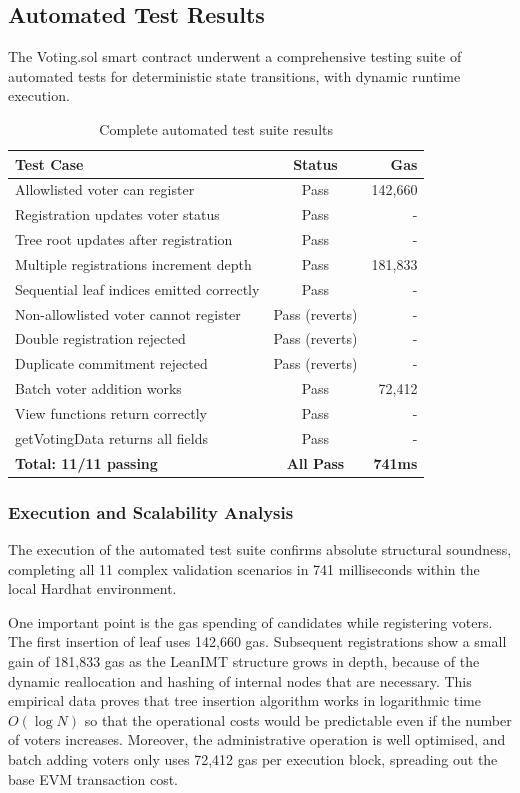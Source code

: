 \documentclass[12pt, a4paper]{report}
\begin{document}
\subsection{Automated Test Results}

The Voting.sol smart contract underwent a comprehensive testing suite of automated tests for deterministic state transitions, with dynamic runtime execution.

\begin{table}[H]
\centering
\caption{Complete automated test suite results}
\label{tab:test_results}
\begin{tabular}{|l|c|r|}
\hline
\textbf{Test Case} & \textbf{Status} & \textbf{Gas} \\ \hline
Allowlisted voter can register & Pass & 142,660 \\ \hline
Registration updates voter status & Pass & - \\ \hline
Tree root updates after registration & Pass & - \\ \hline
Multiple registrations increment depth & Pass & 181,833 \\ \hline
Sequential leaf indices emitted correctly & Pass & - \\ \hline
Non-allowlisted voter cannot register & Pass (reverts) & - \\ \hline
Double registration rejected & Pass (reverts) & - \\ \hline
Duplicate commitment rejected & Pass (reverts) & - \\ \hline
Batch voter addition works & Pass & 72,412 \\ \hline
View functions return correctly & Pass & - \\ \hline
getVotingData returns all fields & Pass & - \\ \hline
\textbf{Total: 11/11 passing} & \textbf{All Pass} & \textbf{741ms} \\ \hline
\end{tabular}
\end{table}

\subsubsection*{Execution and Scalability Analysis}
The execution of the automated test suite confirms absolute structural soundness, completing all 11 complex validation scenarios in 741 milliseconds within the local Hardhat environment. 

One important point is the gas spending of candidates while registering voters. The first insertion of leaf uses 142,660 gas. Subsequent registrations show a small gain of 181,833 gas as the LeanIMT structure grows in depth, because of the dynamic reallocation and hashing of internal nodes that are necessary. This empirical data proves that tree insertion algorithm works in logarithmic time $O(\log N)$ so that the operational costs would be predictable even if the number of voters increases. Moreover, the administrative operation is well optimised, and batch adding voters only uses 72,412 gas per execution block, spreading out the base EVM transaction cost.
\end{document}
